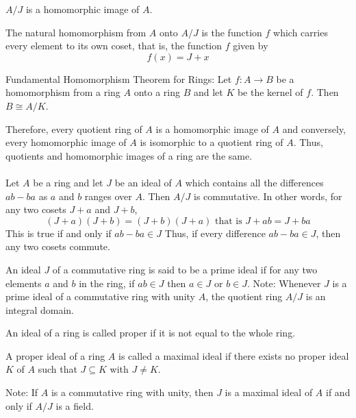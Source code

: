 \documentclass[12pt]{article}
\begin{document}
\begin{theorem} $A/J$ is a homomorphic image of $A$. \end{theorem} 

\begin{definition} The natural homomorphism from $A$ onto $A/J$ is the function $f$ which carries every element to its own coset, that is, the function $f$ given by $$f(x) =  J + x $$ \end{definition} 

\begin{theorem} Fundamental Homomorphism Theorem for Rings: Let $f: A \to B$ be a homomorphism from a ring $A$ onto a ring $B$ and let $K$ be the kernel of $f$. Then $ B \cong A/K$. \end{theorem} 

Therefore, every quotient ring of $A$ is a homomorphic image of $A$ and conversely, every homomorphic image of $A$ is isomorphic to a quotient ring of $A$. Thus, quotients and homomorphic images of a ring are the same. 
\\~\\
 Let $A$ be a ring and let $J$ be an ideal of $A$ which contains all the differences $ab - ba$ as $a$ and $b$ ranges over $A$. Then $A/J$ is commutative. In other words, for any two cosets $J+a$ and $J+b$, $$(J+a)(J+b) = (J+b)(J+a) \text{ that is } J + ab = J + ba $$ 
This is true if and only if $ab - ba \in J$ Thus, if every difference $ab - ba \in J$, then any two cosets commute. 

\begin{definition} An ideal $J$ of a commutative ring is said to be a prime ideal if for any two elements $a$ and $b$ in the ring, if $ab \in J$ then $a \in J$ or $b \in J$. Note: Whenever $J$ is a prime ideal of a commutative ring with unity $A$, the quotient ring $A/J$ is an integral domain. \end{definition} 

\begin{definition} An ideal of a ring is called proper if it is not equal to the whole ring. \end{definition} 

\begin{definition} A proper ideal of a ring $A$ is called a maximal ideal if there exists no proper ideal $K$ of $A$ such that $J \subseteq K$ with $J \neq K$. \end{definition} 

Note: If $A$ is a commutative ring with unity, then $J$ is a maximal ideal of $A$ if and only if $A/J$ is a field. 
\end{document}
